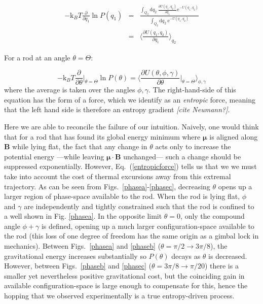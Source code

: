 \documentclass[aps,prl,twocolumn,superscriptaddress]{revtex4-1}
\newcommand{\vcrm}[1]{\mathbf{#1}}
\newcommand{\vc}[1]{\boldsymbol{#1}}
\newcommand{\dd}{\mathrm{d}}
\newcommand{\ee}{\mathrm{e}}
\newcommand{\kk}{\mathrm{k}_B}
\begin{document}
\begin{eqnarray}
-\kk T\frac{\partial }{\partial q_1} \ln{P(q_1)} & = & \frac{\int_{Q_2} \dd q_2 \ \frac{\partial U(q_1,q_2)}{\partial q_1} \ee^{-U(q_1,q_2)} }{\int_{Q_2} \dd q_2 \  \ee^{-U(q_1,q_2)}}\nonumber \\ 
& = & \Big\langle \frac{\partial U(q_1,q_2)}{\partial q_1} \Big\rangle_{q_2}
\end{eqnarray}

For a rod at an angle $\theta=\Theta$:

\begin{equation} \label{entropicforce}
-\kk T\frac{\partial }{\partial \theta}\Big|_{\theta=\Theta} \ln{P(\theta)}  = \Big\langle \frac{\partial U(\theta,\phi,\gamma)}{\partial \theta}\Big|_{\theta=\Theta} \Big\rangle_{\phi,\gamma}
\end{equation}where the average is taken over the angles $\phi,\gamma$. The right-hand-side of this equation has the form of a force, which we identify as an \emph{entropic} force, meaning that the left hand side is therefore an entropy gradient \emph{[cite Neumann?]}.

Here we are able to reconcile the failure of our intuition. Naively, one would think that for a rod that has found its global energy minimum where $\vc{\mu}$ is aligned along $\vcrm{B}$ while lying flat, the fact that any change in $\theta$ acts only to increase the potential energy ---while leaving $\vc{\mu}\cdot\vcrm{B}$ unchanged--- such a change should be suppressed exponentially. However, Eq.\ (\ref{entropicforce}) tells us that we we must take into account the cost of thermal excursions away from this extremal trajectory. As can be seen from Figs.\ \ref{phasea}-\ref{phasec}, decreasing $\theta$ opens up a larger region of phase-space available to the rod. When the rod is lying flat, $\phi$ and $\gamma$ are independently and tightly constrained such that the rod is confined to a well shown in Fig. \ref{phasea}. In the opposite limit $\theta=0$, only the compound angle $\phi+\gamma$ is defined, opening up a much larger configuration-space available to the rod (this loss of one degree of freedom has the same origin as a gimbal lock in mechanics). Between Figs.\ \ref{phasea} and \ref{phaseb} ($\theta=\pi/2\rightarrow 3\pi/8$), the gravitational energy increases substantially so $P(\theta)$ decays as $\theta$ is decreased. However, between Figs.\ \ref{phaseb} and \ref{phasec} ($\theta=3\pi/8\rightarrow\pi/20$) there is a smaller yet nevertheless positive gravitational cost, but the coinciding gain in available configuration-space is large enough to compensate for this, hence the hopping that we observed experimentally is a true entropy-driven process.
\end{document}
